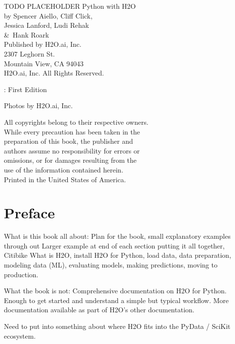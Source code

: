 {\raggedright 

TODO PLACEHOLDER Python with H2O\\

  by Spencer Aiello, Cliff Click, \\ 
Jessica Lanford, Ludi Rehak \\
\&\  Hank Roark\\
\bigskip
  Published by H2O.ai, Inc. \\
2307 Leghorn St. \\
Mountain View, CA 94043\\
\bigskip
\textcopyright \the\year \hspace{1pt} H2O.ai, Inc. All Rights Reserved. 
\bigskip

\monthname \hspace{1pt}  \the\year: First Edition 
\bigskip

Photos by \textcopyright H2O.ai, Inc.
\bigskip

All copyrights belong to their respective owners.\\
While every precaution has been taken in the\\
preparation of this book, the publisher and\\
authors assume no responsibility for errors or\\
omissions, or for damages resulting from the\\
use of the information contained herein.\\
\bigskip
Printed in the United States of America. 
}


\newpage
\thispagestyle{empty}%

\tableofcontents

\newpage

\section{Preface}
What is this book all about:
Plan for the book, small explanatory examples through out
Larger example at end of each section putting it all together, Citibike
What is H2O, install H2O for Python, load data, data preparation,
modeling data (ML), evaluating models, making predictions, moving to production.

What the book is not:
Comprehensive documentation on H2O for Python.  Enough to get started and understand
a simple but typical workflow.  More documentation available as part of H2O's
other documentation.


Need to put into something about where H2O fits into the PyData / SciKit ecosystem.


